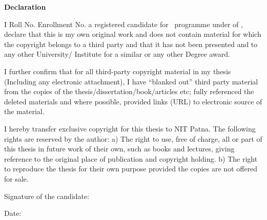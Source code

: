 \begin{center}
    \huge\textbf{Declaration}
\end{center}
\vspace{0.5cm}

I \textbf{\myname} Roll No. \textbf{\rollnumber} Enrollment No. \textbf{\enrollmentnumber} a registered candidate for \courseShort\ programme under \textbf{\department} of \textbf{\collegefullname}, declare that this is my own original work and does not contain material for which the copyright belongs to a third party and that it has not been presented and to any other University/ Institute for a similar or any other Degree award.

I further confirm that for all third-party copyright material in my thesis (Including any electronic attachment), I have “blanked out” third party material from the copies of the thesis/dissertation/book/articles etc; fully referenced the deleted materials and where possible, provided links (URL) to electronic source of the material.

I hereby transfer exclusive copyright for this thesis to NIT Patna. The following rights are reserved by the author: a) The right to use, free of charge, all or part of this thesis in future work of their own, such as books and lectures, giving reference to the original place of publication and copyright holding. b) The right to reproduce the thesis for their own purpose provided the copies are not offered
for sale.

\vspace{1cm}

\noindent Signature of the candidate: \underline{\hspace{7.5cm}}\\

\vspace{0.cm}

\noindent Date: \underline{\hspace{7.5cm}}

\vspace{1cm}

